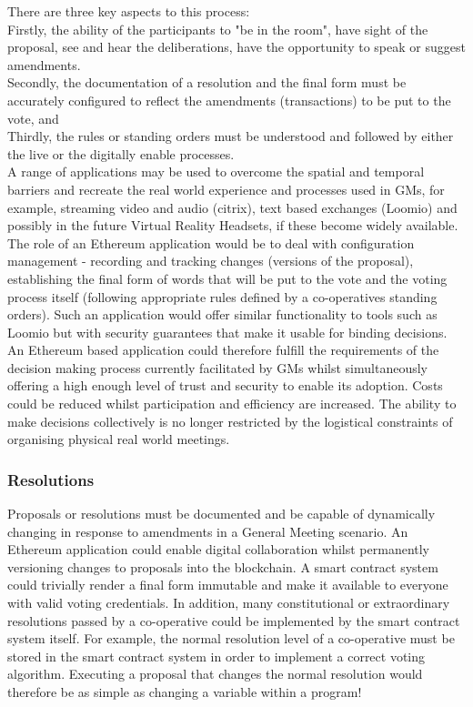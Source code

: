 There are three key aspects to this process:\\

Firstly, the ability of the participants to "be in the room", have sight of the proposal, see and hear the deliberations, have the opportunity to speak or suggest amendments.  \\

Secondly, the documentation of a resolution and the final form must be accurately configured to reflect the amendments (transactions) to be put to the vote, and \\

Thirdly, the rules or standing orders must be understood and followed by either the live or the digitally enable processes.\\

A range of applications may be used to overcome the spatial and temporal barriers and recreate the real world experience and processes used in GMs, for example, streaming video and audio (citrix), text based exchanges (Loomio) and possibly in the future Virtual Reality Headsets, if these become widely available. The role of an Ethereum application would be to deal with configuration management - recording and tracking changes (versions of the proposal), establishing the final form of words that will be put to the vote and the voting process itself (following appropriate rules defined by a co-operatives standing orders). Such an application would offer similar functionality to tools such as Loomio but with security guarantees that make it usable for binding decisions. \\

An Ethereum based application could therefore fulfill the requirements of the decision making process currently facilitated by GMs whilst simultaneously offering a high enough level of trust and security to enable its adoption. Costs could be reduced whilst participation and efficiency are increased. The ability to make decisions collectively is no longer restricted by the logistical constraints of organising physical real world meetings.\\

\subsubsection{Resolutions}
Proposals or resolutions must be documented and be capable of dynamically changing in response to amendments in a General Meeting scenario. An Ethereum application could enable digital collaboration whilst permanently versioning changes to proposals into the blockchain. A smart contract system could trivially render a final form immutable and make it available to everyone with valid voting credentials. In addition, many constitutional or extraordinary resolutions passed by a co-operative could be implemented by the smart contract system itself. For example, the normal resolution level of a co-operative must be stored in the smart contract system in order to implement a correct voting algorithm. Executing a proposal that changes the normal resolution would therefore be as simple as changing a variable within a program!\\

